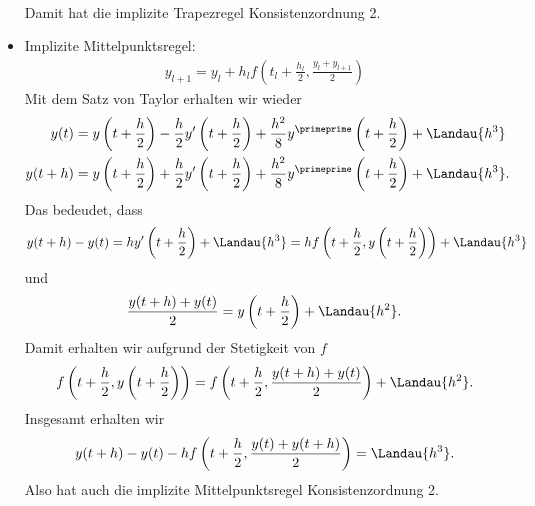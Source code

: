 \begin{solution}
\begin{itemize}
\begin{align*}
  \end{align*}
  Damit hat die implizite Trapezregel Konsistenzordnung 2.
  \item Implizite Mittelpunktsregel:
  \begin{align*}
    y_{l+1} = y_l + h_lf\left(t_l + \frac{h_l}{2},\frac{y_l + y_{l+1}}{2}\right)
  \end{align*}
  Mit dem Satz von Taylor erhalten wir wieder
  \begin{align*}
    y(t) &= y\left(t + \frac{h}{2}\right) - \frac{h}{2}y^{\prime}\left(t + \frac{h}{2}\right)
    + \frac{h^2}{8}y^{\primeprime}\left(t + \frac{h}{2}\right) + \Landau{h^3} \\
    y(t+h) &= y\left(t + \frac{h}{2}\right) + \frac{h}{2}y^{\prime}\left(t + \frac{h}{2}\right)
    + \frac{h^2}{8}y^{\primeprime}\left(t + \frac{h}{2}\right) + \Landau{h^3}.
  \end{align*}
  Das bedeudet, dass
  \begin{align*}
    y(t+h) - y(t) = hy^{\prime}\left(t + \frac{h}{2}\right) + \Landau{h^3}
    = hf\left(t + \frac{h}{2},y\left(t + \frac{h}{2}\right)\right) + \Landau{h^3}
  \end{align*}
  und
  \begin{align*}
    \frac{y(t+h) + y(t)}{2} = y\left(t + \frac{h}{2}\right) + \Landau{h^2}.
  \end{align*}
  Damit erhalten wir aufgrund der Stetigkeit von $f$
  \begin{align*}
    f\left(t + \frac{h}{2},y\left(t + \frac{h}{2}\right)\right) = f\left(t + \frac{h}{2}, \frac{y(t+h) + y(t)}{2}\right) + \Landau{h^2}.
  \end{align*}
  Insgesamt erhalten wir
  \begin{align*}
    y(t+h) - y(t) - hf\left(t + \frac{h}{2},\frac{y(t) + y(t+h)}{2}\right) = \Landau{h^3}.
  \end{align*}
  Also hat auch die implizite Mittelpunktsregel Konsistenzordnung 2.
\end{itemize}
\end{solution}
